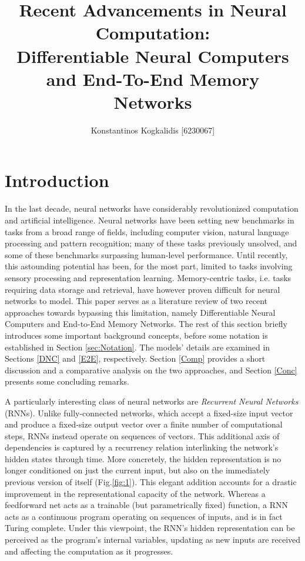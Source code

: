 \documentclass[]{article}
\begin{document}
\author{Konstantinos Kogkalidis [6230067]}
\title{Recent Advancements in Neural Computation: \\
\large Differentiable Neural Computers and End-To-End Memory Networks}
\maketitle

\section{Introduction}
In the last decade, neural networks have considerably revolutionized computation and artificial intelligence. Neural networks have been setting new benchmarks in tasks from a broad range of fields, including computer vision, natural language processing and pattern recognition; many of these tasks previously unsolved, and some of these benchmarks surpassing human-level performance. Until recently, this astounding potential has been, for the most part, limited to tasks involving sensory processing and representation learning. Memory-centric tasks, i.e. tasks requiring data storage and retrieval, have however proven difficult for neural networks to model. This paper serves as a literature review of two recent approaches towards bypassing this limitation, namely Differentiable Neural Computers\cite{Graves2016} and End-to-End Memory Networks\cite{NIPS2015_5846}. The rest of this section briefly introduces some important background concepts, before some notation is established in Section \ref{sec:Notation}. The models' details are examined in Sections \ref{DNC} and \ref{E2E}, respectively. Section \ref{Comp} provides a short discussion and a comparative analysis on the two approaches, and Section \ref{Conc} presents some concluding remarks.

A particularly interesting class of neural networks are \textit{Recurrent Neural Networks} (RNNs). Unlike fully-connected networks, which accept a fixed-size input vector and produce a fixed-size output vector over a finite number of computational steps, RNNs instead operate on sequences of vectors. This additional axis of dependencies is captured by a recurrency relation interlinking the network's hidden states through time. More concretely, the hidden representation is no longer conditioned on just the current input, but also on the immediately previous version of itself (Fig.\ref{fig:1}). This elegant addition accounts for a drastic improvement in the representational capacity of the network. Whereas a feedforward net acts as a trainable (but parametrically fixed) function, a RNN acts as a continuous program operating on sequences of inputs, and is in fact Turing complete\cite{Siegelmann545}. Under this viewpoint, the RNN's hidden representation can be perceived as the program's internal variables, updating as new inputs are received and affecting the computation as it progresses.
\end{document}
